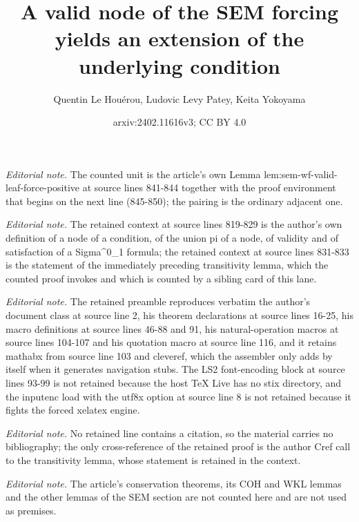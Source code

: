 \documentclass{article}
\title{A valid node of the SEM forcing yields an extension of the underlying condition}
\author{Quentin Le Houérou, Ludovic Levy Patey, Keita Yokoyama}
\date{arxiv:2402.11616v3; CC BY 4.0}
\numberwithin{theorem}{section}
\begin{document}
\maketitle
\noindent\textit{Editorial note.} The counted unit is the article's own Lemma lem:sem-wf-valid-leaf-force-positive at source lines 841-844 together with the proof environment that begins on the next line (845-850); the pairing is the ordinary adjacent one.\par\medskip
\noindent\textit{Editorial note.} The retained context at source lines 819-829 is the author's own definition of a node of a condition, of the union pi of a node, of validity and of satisfaction of a Sigma\textasciicircum{}0\_1 formula; the retained context at source lines 831-833 is the statement of the immediately preceding transitivity lemma, which the counted proof invokes and which is counted by a sibling card of this lane.\par\medskip
\noindent\textit{Editorial note.} The retained preamble reproduces verbatim the author's document class at source line 2, his theorem declarations at source lines 16-25, his macro definitions at source lines 46-88 and 91, his natural-operation macros at source lines 104-107 and his quotation macro at source line 116, and it retains mathabx from source line 103 and cleveref, which the assembler only adds by itself when it generates navigation stubs. The LS2 font-encoding block at source lines 93-99 is not retained because the host TeX Live has no stix directory, and the inputenc load with the utf8x option at source line 8 is not retained because it fights the forced xelatex engine.\par\medskip
\noindent\textit{Editorial note.} No retained line contains a citation, so the material carries no bibliography; the only cross-reference of the retained proof is the author Cref call to the transitivity lemma, whose statement is retained in the context.\par\medskip
\noindent\textit{Editorial note.} The article's conservation theorems, its COH and WKL lemmas and the other lemmas of the SEM section are not counted here and are not used as premises.\par\medskip
\end{document}
